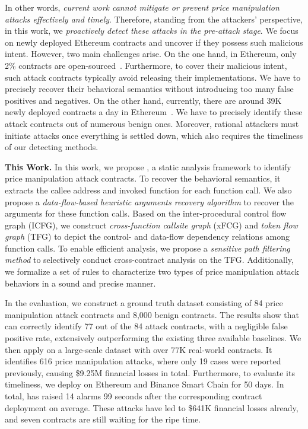 In other words, \textit{current work cannot mitigate or prevent price manipulation attacks effectively and timely}.
Therefore, standing from the attackers' perspective, in this work, we \textit{proactively detect these attacks in the pre-attack stage}. We focus on newly deployed Ethereum contracts and uncover if they possess such malicious intent.
However, two main challenges arise.
On the one hand, in Ethereum, only 2\% contracts are open-sourced~\cite{percent}. Furthermore, to cover their malicious intent, such attack contracts typically avoid releasing their implementations. We have to precisely recover their behavioral semantics without introducing too many false positives and negatives.
On the other hand, currently, there are around 39K newly deployed contracts a day in Ethereum~\cite{daily}. We have to precisely identify these attack contracts out of numerous benign ones. Moreover, rational attackers must initiate attacks once everything is settled down, which also requires the timeliness of our detecting methods.


\textbf{This Work.}
In this work, we propose {\tool}, a static analysis framework to identify price manipulation attack contracts.
To recover the behavioral semantics, it extracts the callee address and invoked function for each function call. We also propose a \textit{data-flow-based heuristic arguments recovery algorithm} to recover the arguments for these function calls.
Based on the inter-procedural control flow graph (ICFG), we construct \textit{cross-function callsite graph} (xFCG) and \textit{token flow graph} (TFG) to depict the control- and data-flow dependency relations among function calls.
To enable efficient analysis, we propose a \textit{sensitive path filtering method} to selectively conduct cross-contract analysis on the TFG. Additionally, we formalize a set of rules to characterize two types of price manipulation attack behaviors in a sound and precise manner.


In the evaluation, we construct a ground truth dataset consisting of 84 price manipulation attack contracts and 8,000 benign contracts. The results show that {\tool} can correctly identify 77 out of the 84 attack contracts, with a negligible false positive rate, extensively outperforming the existing three available baselines.
We then apply {\tool} on a large-scale dataset with over 77K real-world contracts. It identifies 616 price manipulation attacks, where only 19 cases were reported previously, causing \$9.25M financial losses in total.
Furthermore, to evaluate its timeliness, we deploy {\tool} on Ethereum and Binance Smart Chain for 50 days. In total, {\tool} has raised 14 alarms 99 seconds after the corresponding contract deployment on average. These attacks have led to \$641K financial losses already, and seven contracts are still waiting for the ripe time.


